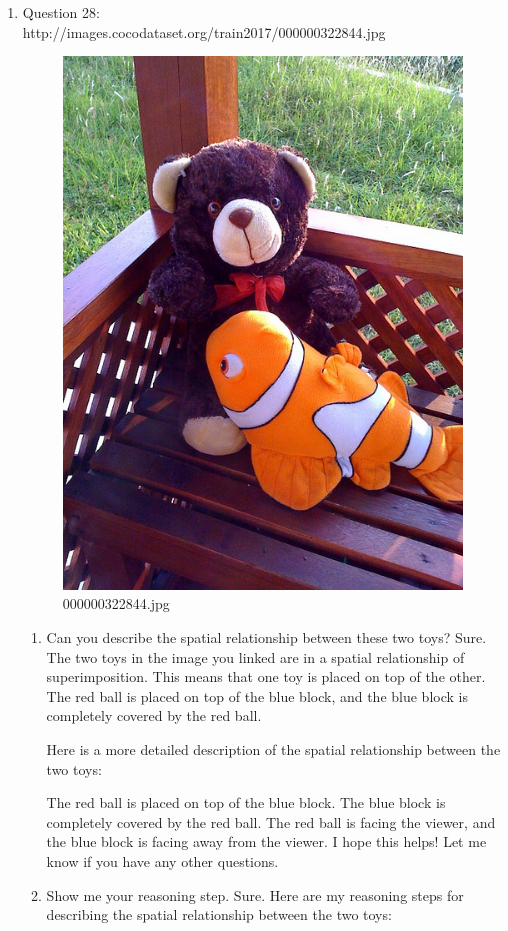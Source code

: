 \begin{enumerate}
\begin{enumerate}
        I hope this explanation is helpful! Let me know if you have any other questions.
    \end{enumerate}
    \item Question 28:\\http://images.cocodataset.org/train2017/000000322844.jpg
    \begin{figure}[h]
        \centering
        \includegraphics[width=0.8\linewidth]{../image set/easy/000000322844.jpg}
        \caption{000000322844.jpg}
    \end{figure}
    \begin{enumerate}
        \item Can you describe the spatial relationship between these two toys?
        \subitem 
        Sure. The two toys in the image you linked are in a spatial relationship of superimposition. This means that one toy is placed on top of the other. The red ball is placed on top of the blue block, and the blue block is completely covered by the red ball.
        
        Here is a more detailed description of the spatial relationship between the two toys:
        
        The red ball is placed on top of the blue block.
        The blue block is completely covered by the red ball.
        The red ball is facing the viewer, and the blue block is facing away from the viewer.
        I hope this helps! Let me know if you have any other questions.
        \item Show me your reasoning step.
        \subitem Sure. Here are my reasoning steps for describing the spatial relationship between the two toys:


\end{enumerate}
\end{enumerate}
